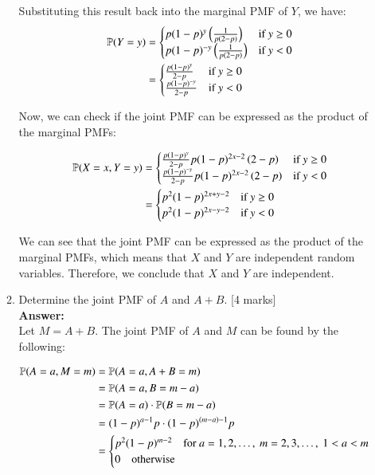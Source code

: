 \documentclass[12pt]{article}
\begin{document}
\begin{enumerate}
\begin{enumerate}
Substituting this result back into the marginal PMF of $Y$, we have:
\begin{align*}
{\mathbb P}(Y=y) &= \begin{cases}
p(1-p)^{y} \left(\frac{1}{p(2-p)}\right) & \text{if } y \geq 0 \\
p(1-p)^{-y} \left(\frac{1}{p(2-p)}\right) & \text{if } y < 0
\end{cases} \\
&= \begin{cases}
\frac{p(1-p)^{y}}{2-p} & \text{if } y \geq 0 \\
\frac{p(1-p)^{-y}}{2-p} & \text{if } y < 0
\end{cases}
\end{align*}

Now, we can check if the joint PMF can be expressed as the product of the marginal PMFs:

\begin{align*}
{\mathbb P}(X=x, Y=y) &= \begin{cases}
\frac{p(1-p)^{y}}{2-p} p(1-p)^{2x-2} \left( 2-p \right) & \text{if } y \geq 0 \\
\frac{p(1-p)^{-y}}{2-p} p(1-p)^{2x-2} \left( 2-p \right) & \text{if } y < 0
\end{cases} \\
&= \begin{cases}
p^2(1-p)^{2x+y-2} & \text{if } y \geq 0 \\
p^2(1-p)^{2x-y-2} & \text{if } y < 0
\end{cases} \\
\end{align*}

We can see that the joint PMF can be expressed as the product of the marginal PMFs, which means that $X$ and $Y$ are independent random variables. Therefore, we conclude that $X$ and $Y$ are independent.
%

\item Determine the joint PMF of $A$ and $A+B$. 
			\hfill [4 marks]
%
\\
\textbf{Answer:}
\\
Let $M = A + B$. The joint PMF of $A$ and $M$ can be found by the following:

\begin{align*}
{\mathbb P}(A=a, M=m) &= {\mathbb P}(A=a, A+B=m) \\
&= {\mathbb P}(A=a, B=m-a) \\
&= {\mathbb P}(A=a) \cdot {\mathbb P}(B=m-a) \\
&= (1-p)^{a-1}p \cdot (1-p)^{(m-a)-1}p \\
&= \begin{cases}
p^2(1-p)^{m-2} \quad \text{for } a=1,2,\ldots,\ m=2,3,\ldots,\ 1 < a < m \\
0 \quad \text{otherwise}
\end{cases} \\
\end{align*}
%


\end{enumerate}
\end{enumerate}
\end{document}
